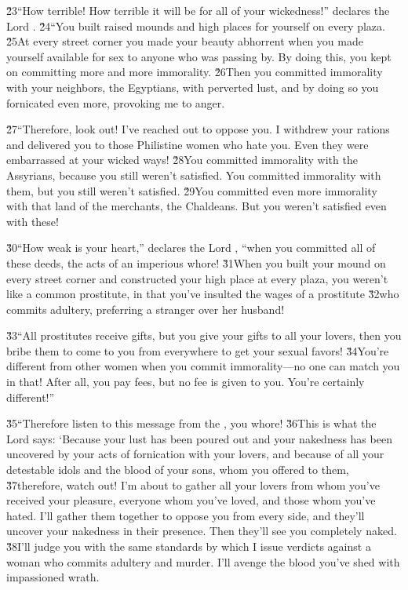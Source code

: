 \v{23}``How terrible! How terrible it will be for all of your wickedness!'' declares the Lord . \v{24}``You built raised mounds and high places for yourself on every plaza. \v{25}At every street corner you made your beauty abhorrent when you made yourself available for sex to anyone who was passing by. By doing this, you kept on committing more and more immorality. \v{26}Then you committed immorality with your neighbors, the Egyptians, with perverted lust, and by doing so you fornicated even more, provoking me to anger.

\v{27}``Therefore, look out! I've reached out to oppose you. I withdrew your rations and delivered you to those Philistine women who hate you. Even they were embarrassed at your wicked ways! \v{28}You committed immorality with the Assyrians, because you still weren't satisfied. You committed immorality with them, but you still weren't satisfied. \v{29}You committed even more immorality with that land of the merchants, the Chaldeans. But you weren't satisfied even with these!

\v{30}``How weak is your heart,'' declares the Lord , ``when you committed all of these deeds, the acts of an imperious whore! \v{31}When you built your mound on every street corner and constructed your high place at every plaza, you weren't like a common prostitute, in that you've insulted the wages of a prostitute \v{32}who commits adultery, preferring a stranger over her husband!

\v{33}``All prostitutes receive gifts, but you give your gifts to all your lovers, then you bribe them to come to you from everywhere to get your sexual favors! \v{34}You're different from other women when you commit immorality---no one can match you in that! After all, you pay fees, but no fee is given to you. You're certainly different!''

\v{35}``Therefore listen to this message from the , you whore! \v{36}This is what the Lord  says: `Because your lust has been poured out and your nakedness has been uncovered by your acts of fornication with your lovers, and because of all your detestable idols and the blood of your sons, whom you offered to them, \v{37}therefore, watch out! I'm about to gather all your lovers from whom you've received your pleasure, everyone whom you've loved, and those whom you've hated. I'll gather them together to oppose you from every side, and they'll uncover your nakedness in their presence. Then they'll see you completely naked. \v{38}I'll judge you with the same standards by which I issue verdicts against a woman who commits adultery and murder. I'll avenge the blood you've shed with impassioned wrath.


